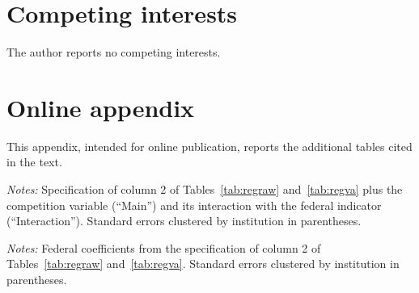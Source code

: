 \documentclass[12pt,letterpaper]{article}
\begin{document}
\section*{Competing interests}
The author reports no competing interests.




\processdelayedfloats
\clearpage
\appendix
\renewcommand{\thetable}{A\arabic{table}}
\setcounter{table}{0}
\setcounter{posttable}{0}
\renewcommand{\theposttable}{A\arabic{posttable}}
\section*{Online appendix}

This appendix, intended for online publication, reports the additional tables cited in the text.

\begin{table}[!htbp]
\centering\footnotesize
\caption{Interactions between the federal indicator and competition for seats, Enade 2023}\label{tab:interactions}
\resizebox{\linewidth}{!}{}
\begin{minipage}{\linewidth}\vspace{0.4em}\scriptsize
\textit{Notes:} Specification of column 2 of Tables~\ref{tab:regraw} and~\ref{tab:regva} plus the competition variable (``Main'') and its interaction with the federal indicator (``Interaction''). Standard errors clustered by institution in parentheses.
\end{minipage}
\end{table}

\begin{table}[!htbp]
\centering\small
\caption{Robustness of the federal coefficients, Enade 2023}\label{tab:robustness}

\begin{minipage}{\linewidth}\vspace{0.4em}\scriptsize
\textit{Notes:} Federal coefficients from the specification of column 2 of Tables~\ref{tab:regraw} and~\ref{tab:regva}. Standard errors clustered by institution in parentheses.
\end{minipage}
\end{table}
\end{document}
